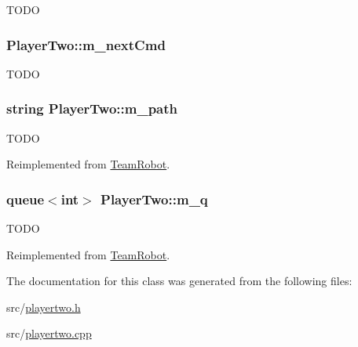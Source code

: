 \label{classPlayerTwo_af294f3bef80e0df881b4452c1272376a}
TODO \hypertarget{classPlayerTwo_a35bab8a32976849cd72828a1a1fe8504}{
\subsubsection[{m\_\-nextCmd}]{ {\bf PlayerTwo::m\_\-nextCmd}}}
\label{classPlayerTwo_a35bab8a32976849cd72828a1a1fe8504}
TODO \hypertarget{classPlayerTwo_af9880885ced53351b52dcc949f6df162}{
\subsubsection[{m\_\-path}]{\setlength{\rightskip}{0pt plus 5cm}string {\bf PlayerTwo::m\_\-path}}}
\label{classPlayerTwo_af9880885ced53351b52dcc949f6df162}
TODO 

Reimplemented from \hyperlink{classTeamRobot_af170b8d2e1b76b12f8cc83f6ec908e40}{TeamRobot}.

\hypertarget{classPlayerTwo_ac2f70709bd48ad9f5c2435cbff1e65b3}{
\subsubsection[{m\_\-q}]{\setlength{\rightskip}{0pt plus 5cm}queue$<$int$>$ {\bf PlayerTwo::m\_\-q}}}
\label{classPlayerTwo_ac2f70709bd48ad9f5c2435cbff1e65b3}
TODO 

Reimplemented from \hyperlink{classTeamRobot_a982ed6b6964c5e8b94519ef91b52c468}{TeamRobot}.



The documentation for this class was generated from the following files:\begin{DoxyCompactItemize}
\item 
src/\hyperlink{playertwo_8h}{playertwo.h}\item 
src/\hyperlink{playertwo_8cpp}{playertwo.cpp}\end{DoxyCompactItemize}

